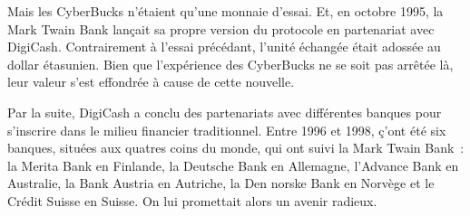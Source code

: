 Mais les CyberBucks n'étaient qu'une monnaie d'essai. Et, en octobre 1995, la Mark Twain Bank lançait sa propre version du protocole en partenariat avec DigiCash. Contrairement à l'essai précédant, l'unité échangée était adossée au dollar étasunien. Bien que l'expérience des CyberBucks ne se soit pas arrêtée là, leur valeur s'est effondrée à cause de cette nouvelle. %

Par la suite, DigiCash a conclu des partenariats avec différentes banques pour s'inscrire dans le milieu financier traditionnel. Entre 1996 et 1998, ç'ont été six banques, situées aux quatres coins du monde, qui ont suivi la Mark Twain Bank~: la Merita Bank en Finlande, la Deutsche Bank en Allemagne, l'Advance Bank en Australie, la Bank Austria en Autriche, la Den norske Bank en Norvège et le Crédit Suisse en Suisse. On lui promettait alors un avenir radieux.

